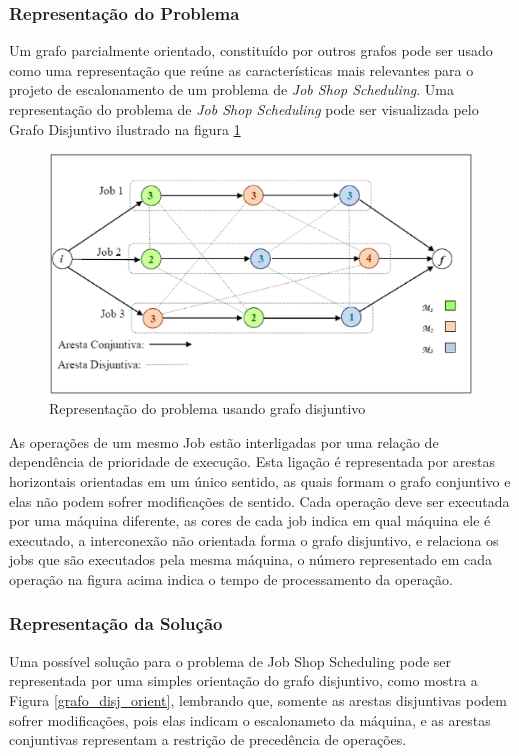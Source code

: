 \subsubsection{Representação do Problema}
Um grafo parcialmente orientado, constituído por outros grafos pode ser usado como uma representação que reúne as características mais relevantes para o projeto de escalonamento de um problema de \textit{Job Shop Scheduling}. Uma representação do problema de \textit{Job Shop Scheduling} pode ser visualizada pelo Grafo Disjuntivo ilustrado na figura \ref{grafo_disjunt} 

\begin{figure}[H]
\centering
\includegraphics[scale = 0.6]{graficos/grafo_disjuntivo.eps}
\caption{Representação do problema usando grafo disjuntivo}
\label{grafo_disjunt}
\end{figure}

As operações de um mesmo Job estão interligadas por uma relação de dependência de prioridade de execução. Esta ligação é representada por arestas horizontais orientadas em um único sentido, as quais formam o grafo conjuntivo e elas não podem sofrer modificações de sentido. Cada operação deve ser executada por uma máquina diferente, as cores de cada job indica em qual máquina ele é executado, a interconexão não orientada forma o grafo disjuntivo, e relaciona os jobs que são executados pela mesma máquina, o número representado em cada operação na figura acima indica o tempo de processamento da operação.

\subsubsection{Representação da Solução}
Uma possível solução para o problema de Job Shop Scheduling pode ser representada por uma simples orientação do grafo disjuntivo, como mostra a Figura \ref{grafo_disj_orient}, lembrando que, somente as arestas disjuntivas podem sofrer modificações, pois elas indicam o escalonameto da máquina, e as arestas conjuntivas representam a restrição de precedência de operações.
	
